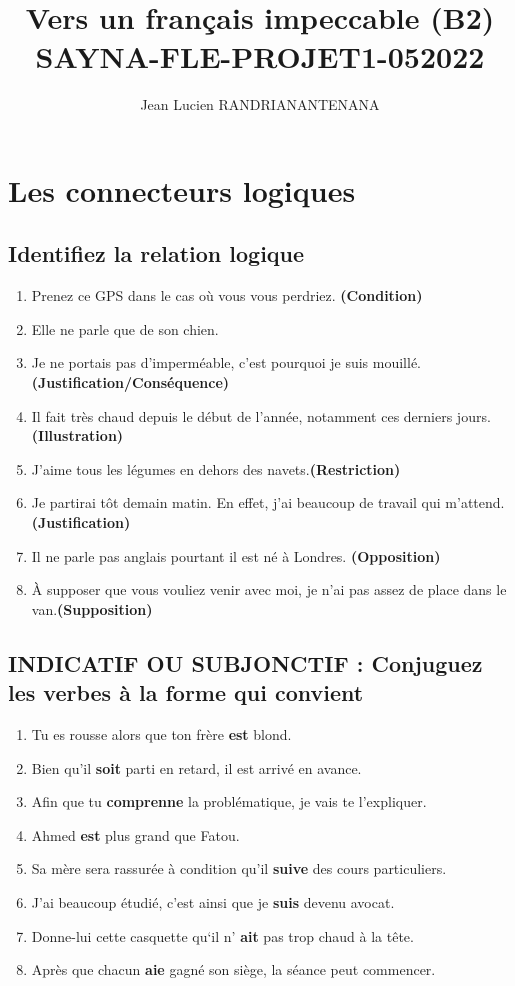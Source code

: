 \documentclass[12pt]{article}
\author{Jean Lucien RANDRIANANTENANA}
\title{Vers un français
impeccable (B2)\\SAYNA-FLE-PROJET1-052022}
\newcommand{\colo}[1]{{\color{blue}\textbf{#1}}}
\begin{document}
\maketitle
\tableofcontents
\newpage
\section{Les connecteurs logiques}
\subsection{Identifiez la relation logique}
\begin{enumerate}
	\item Prenez ce GPS dans le cas où vous vous perdriez. \colo{(Condition)}
	\item Elle ne parle que de son chien.
	\item Je ne portais pas d’imperméable, c'est pourquoi je suis mouillé. \colo{(Justification/Conséquence)}
	\item Il fait très chaud depuis le début de l’année, notamment ces derniers jours. \colo{(Illustration)}
	\item J'aime tous les légumes en dehors des navets.\colo{(Restriction)}
	\item Je partirai tôt demain matin. En effet, j'ai beaucoup de travail qui m’attend. \colo{(Justification)}
	\item Il ne parle pas anglais pourtant il est né à Londres. \colo{(Opposition)}
	\item À supposer que vous vouliez venir avec moi, je n'ai pas assez de place dans le van.\colo{(Supposition)}
\end{enumerate}
\subsection{INDICATIF OU SUBJONCTIF : Conjuguez les verbes à la forme qui convient}
\begin{enumerate}
	\item Tu es rousse alors que ton frère \colo{est} blond.
	\item Bien qu’il \colo{soit} parti en retard, il est arrivé en avance.
	\item Afin que tu \colo{comprenne} la problématique, je vais te l’expliquer. \item Ahmed \colo{est} plus grand que Fatou.
	\item Sa mère sera rassurée à condition qu'il \colo{suive} des cours particuliers.
	\item J’ai beaucoup étudié, c’est ainsi que je \colo{suis} devenu avocat.
	\item Donne-lui cette casquette qu‘il n’ \colo{ait} pas trop chaud à la tête.
	\item Après que chacun \colo{aie} gagné son siège, la séance peut commencer.
\end{enumerate}
\end{document}
